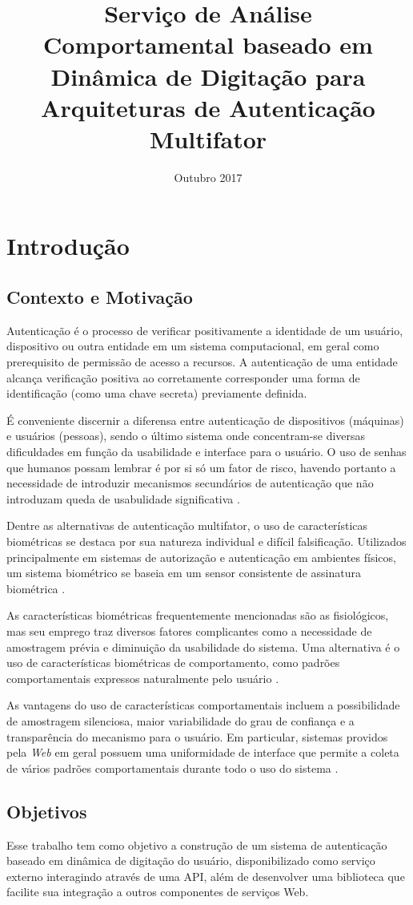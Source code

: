 \documentclass[pfc]{imetex}
\title{Serviço de Análise Comportamental baseado em Dinâmica de Digitação para Arquiteturas de Autenticação Multifator}
\date{Outubro 2017}
\begin{document}
\chapter{Introdução}

\section{Contexto e Motivação}
Autenticação é o processo de verificar positivamente a identidade de um usuário, dispositivo ou outra entidade em um sistema computacional, em geral como prerequisito de permissão de acesso a recursos. A autenticação de uma entidade alcança verificação positiva ao corretamente corresponder uma forma de identificação (como uma chave secreta) previamente definida. \cite{OGorman2003}

É conveniente discernir a diferensa entre autenticação de dispositivos (máquinas) e usuários (pessoas), sendo o último sistema onde concentram-se diversas dificuldades em função da usabilidade e interface para o usuário. \cite{OGorman2003} O uso de senhas que humanos possam lembrar é por si só um fator de risco, havendo portanto a necessidade de introduzir mecanismos secundários de autenticação que não introduzam queda de usabulidade significativa \cite{Morris1979}.


Dentre as alternativas de autenticação multifator, o uso de características biométricas se destaca por sua natureza individual e difícil falsificação. Utilizados principalmente em sistemas de autorização e autenticação em ambientes físicos, um sistema biométrico se baseia em um sensor consistente de assinatura biométrica \cite{EdDawson2003}.

As características biométricas frequentemente mencionadas são as fisiológicos, mas seu emprego traz diversos fatores complicantes como a necessidade de amostragem prévia e diminuição da usabilidade do sistema. Uma alternativa é o uso de características biométricas de comportamento, como padrões comportamentais expressos naturalmente pelo usuário \cite{Moskovitch2009}.

As vantagens do uso de características comportamentais incluem a possibilidade de amostragem silenciosa, maior variabilidade do grau de confiança e a transparência do mecanismo para o usuário. Em particular, sistemas providos pela \textit{Web} em geral possuem uma uniformidade de interface que permite a coleta de vários padrões comportamentais durante todo o uso do sistema \cite{Moskovitch2009}.	


\section{Objetivos}
Esse trabalho tem como objetivo a construção de um sistema de autenticação baseado em dinâmica de digitação do usuário, disponibilizado como serviço externo interagindo através de uma API, além de desenvolver uma biblioteca que facilite sua integração a outros componentes de serviços Web.
\end{document}

